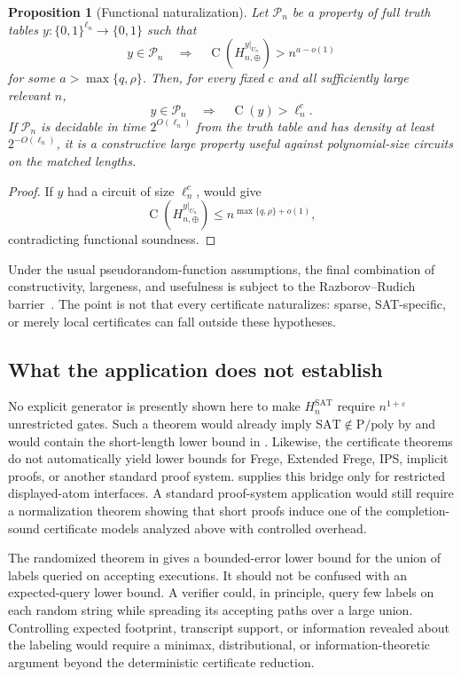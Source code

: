 \documentclass[11pt]{article}
\newtheorem{proposition}[theorem]{Proposition}
\theoremstyle{definition}
\newcommand{\bits}{\{0,1\}}
\newcommand{\Ckt}{\operatorname{C}}
\newcommand{\SAT}{\mathrm{SAT}}
\newcommand{\Ppoly}{\mathrm{P/poly}}
\newcommand{\eps}{\varepsilon}
\begin{document}
\begin{proposition}[Functional naturalization]\label{prop:naturalization}
Let $\mathcal P_n$ be a property of full truth tables $y:\bits^{\ell_n}\to\bits$ such that
\[
  y\in\mathcal P_n
  \quad\Longrightarrow\quad
  \Ckt(H_{n,\oplus}^{y|_{U_n}})>n^{a-o(1)}
\]
for some $a>\max\{q,\rho\}$.  Then, for every fixed $c$ and all sufficiently large relevant $n$,
\[
  y\in\mathcal P_n
  \quad\Longrightarrow\quad
  \Ckt(y)>\ell_n^c.
\]
If $\mathcal P_n$ is decidable in time $2^{O(\ell_n)}$ from the truth table and has density at least $2^{-O(\ell_n)}$, it is a constructive large property useful against polynomial-size circuits on the matched lengths.
\end{proposition}

\begin{proof}
If $y$ had a circuit of size $\ell_n^c$,  would give
\[
  \Ckt(H_{n,\oplus}^{y|_{U_n}})
  \le n^{\max\{q,\rho\}+o(1)},
\]
contradicting functional soundness.
\end{proof}

Under the usual pseudorandom-function assumptions, the final combination of constructivity, largeness, and usefulness is subject to the Razborov--Rudich barrier~\cite{RR97}.  The point is not that every certificate naturalizes: sparse, SAT-specific, or merely local certificates can fall outside these hypotheses.

\subsection{What the application does not establish}

No explicit generator is presently shown here to make $H_n^{\SAT}$ require $n^{1+\eps}$ unrestricted gates.  Such a theorem would already imply $\SAT\notin\Ppoly$ by  and would contain the short-length lower bound in .  Likewise, the certificate theorems do not automatically yield lower bounds for Frege, Extended Frege, IPS, implicit proofs, or another standard proof system.   supplies this bridge only for restricted displayed-atom interfaces.  A standard proof-system application would still require a normalization theorem showing that short proofs induce one of the completion-sound certificate models analyzed above with controlled overhead.

The randomized theorem in  gives a bounded-error lower bound for the union of labels queried on accepting executions.  It should not be confused with an expected-query lower bound.  A verifier could, in principle, query few labels on each random string while spreading its accepting paths over a large union.  Controlling expected footprint, transcript support, or information revealed about the labeling would require a minimax, distributional, or information-theoretic argument beyond the deterministic certificate reduction.
\end{document}
